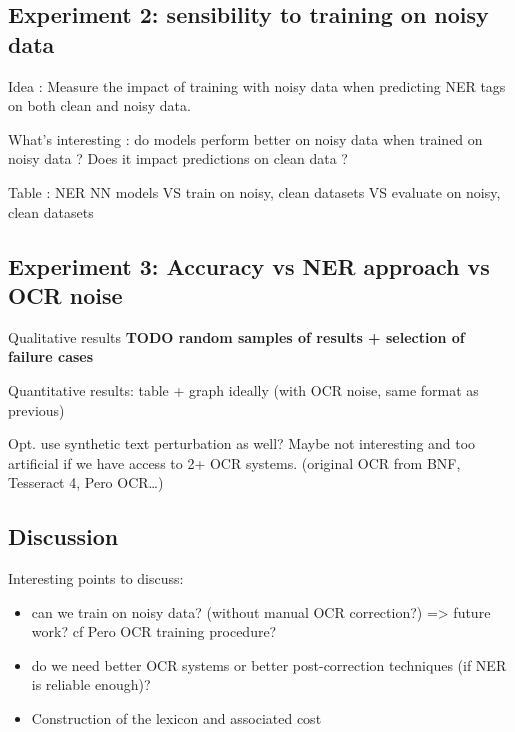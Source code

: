 \subsection{Experiment 2: sensibility to training on noisy data}
Idea : Measure the impact of training with noisy data when predicting NER tags on both clean and noisy data.

What's interesting : do models perform better on noisy data when trained on noisy data ? Does it impact predictions on clean data ?

Table : NER NN models VS train on {noisy, clean} datasets VS evaluate on {noisy, clean} datasets


\subsection{Experiment 3: Accuracy vs NER approach vs OCR noise}

Qualitative results
\textbf{TODO random samples of results + selection of failure cases}

Quantitative results: table + graph ideally (with OCR noise, same format as previous)

Opt. use synthetic text perturbation as well? Maybe not interesting and too artificial if we have access to 2+ OCR systems.
(original OCR from BNF, Tesseract 4, Pero OCR…)


\subsection{Discussion}
Interesting points to discuss:
\begin{itemize}
    \item can we train on noisy data? (without manual OCR correction?) => future work? cf Pero OCR training procedure?
    \item do we need better OCR systems or better post-correction techniques (if NER is reliable enough)?
    \item Construction of the lexicon and associated cost
\end{itemize}
